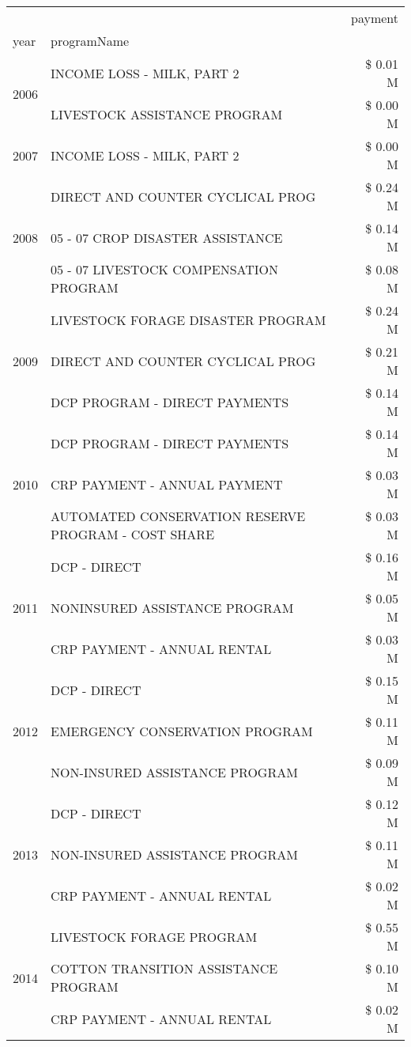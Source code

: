 \begin{tabular}{llr}
\toprule
 &  & payment \\
year & programName &  \\
\midrule
\multirow[t]{2}{*}{2006} & INCOME LOSS - MILK, PART 2 & \$ 0.01 M \\
 & LIVESTOCK ASSISTANCE PROGRAM & \$ 0.00 M \\
\cline{1-3}
2007 & INCOME LOSS - MILK, PART 2 & \$ 0.00 M \\
\cline{1-3}
\multirow[t]{3}{*}{2008} & DIRECT AND COUNTER CYCLICAL PROG & \$ 0.24 M \\
 & 05 - 07 CROP DISASTER ASSISTANCE & \$ 0.14 M \\
 & 05 - 07 LIVESTOCK COMPENSATION PROGRAM & \$ 0.08 M \\
\cline{1-3}
\multirow[t]{3}{*}{2009} & LIVESTOCK FORAGE DISASTER  PROGRAM & \$ 0.24 M \\
 & DIRECT AND COUNTER CYCLICAL PROG & \$ 0.21 M \\
 & DCP PROGRAM - DIRECT PAYMENTS & \$ 0.14 M \\
\cline{1-3}
\multirow[t]{3}{*}{2010} & DCP PROGRAM - DIRECT PAYMENTS & \$ 0.14 M \\
 & CRP PAYMENT - ANNUAL PAYMENT & \$ 0.03 M \\
 & AUTOMATED CONSERVATION RESERVE PROGRAM - COST SHARE & \$ 0.03 M \\
\cline{1-3}
\multirow[t]{3}{*}{2011} & DCP - DIRECT & \$ 0.16 M \\
 & NONINSURED ASSISTANCE PROGRAM & \$ 0.05 M \\
 & CRP PAYMENT - ANNUAL RENTAL & \$ 0.03 M \\
\cline{1-3}
\multirow[t]{3}{*}{2012} & DCP - DIRECT & \$ 0.15 M \\
 & EMERGENCY CONSERVATION PROGRAM & \$ 0.11 M \\
 & NON-INSURED ASSISTANCE PROGRAM & \$ 0.09 M \\
\cline{1-3}
\multirow[t]{3}{*}{2013} & DCP - DIRECT & \$ 0.12 M \\
 & NON-INSURED ASSISTANCE PROGRAM & \$ 0.11 M \\
 & CRP PAYMENT - ANNUAL RENTAL & \$ 0.02 M \\
\cline{1-3}
\multirow[t]{3}{*}{2014} & LIVESTOCK FORAGE PROGRAM & \$ 0.55 M \\
 & COTTON TRANSITION ASSISTANCE PROGRAM & \$ 0.10 M \\
 & CRP PAYMENT - ANNUAL RENTAL & \$ 0.02 M \\
\cline{1-3}

\end{tabular}
